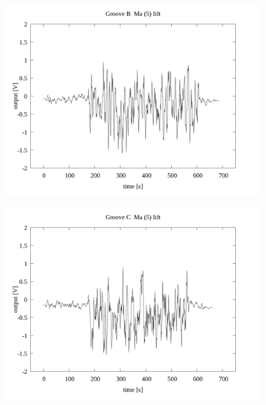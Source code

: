 \documentclass[a4paper]{jsarticle}
\begin{document}
\begin{figure}[htbp]
    \footnotesize
    \begin{center}
        \includegraphics[width=140mm]{../../../../33_result/210806/moving_average/5/lift/01/Groove_B_ma(5)_lift_01.png}
    \end{center}
\end{figure}

\begin{figure}[htbp]
    \footnotesize
    \begin{center}
        \includegraphics[width=140mm]{../../../../33_result/210806/moving_average/5/lift/01/Groove_C_ma(5)_lift_01.png}
    \end{center}
\end{figure}
\end{document}
